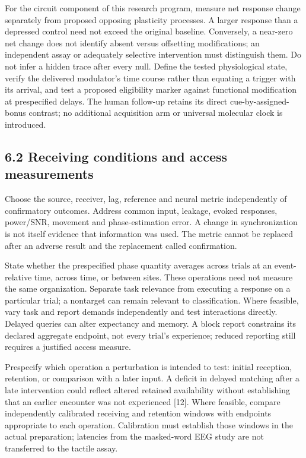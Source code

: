 \documentclass[
  american,
  11pt,
  letterpaper,
]{article}
\begin{document}
For the circuit component of this research program, measure net response change separately from proposed opposing plasticity processes. A larger response than a depressed control need not exceed the original baseline. Conversely, a near-zero net change does not identify absent versus offsetting modifications; an independent assay or adequately selective intervention must distinguish them. Do not infer a hidden trace after every null. Define the tested physiological state, verify the delivered modulator's time course rather than equating a trigger with its arrival, and test a proposed eligibility marker against functional modification at prespecified delays. The human follow-up retains its direct cue-by-assigned-bonus contrast; no additional acquisition arm or universal molecular clock is introduced.

\subsection{6.2 Receiving conditions and access measurements}\label{receiving-conditions-and-access-measurements}

Choose the source, receiver, lag, reference and neural metric independently of confirmatory outcomes. Address common input, leakage, evoked responses, power/SNR, movement and phase-estimation error. A change in synchronization is not itself evidence that information was used. The metric cannot be replaced after an adverse result and the replacement called confirmation.

State whether the prespecified phase quantity averages across trials at an event-relative time, across time, or between sites. These operations need not measure the same organization. Separate task relevance from executing a response on a particular trial; a nontarget can remain relevant to classification. Where feasible, vary task and report demands independently and test interactions directly. Delayed queries can alter expectancy and memory. A block report constrains its declared aggregate endpoint, not every trial's experience; reduced reporting still requires a justified access measure.

Prespecify which operation a perturbation is intended to test: initial reception, retention, or comparison with a later input. A deficit in delayed matching after a late intervention could reflect altered retained availability without establishing that an earlier encounter was not experienced {[}12{]}. Where feasible, compare independently calibrated receiving and retention windows with endpoints appropriate to each operation. Calibration must establish those windows in the actual preparation; latencies from the masked-word EEG study are not transferred to the tactile assay.
\end{document}
